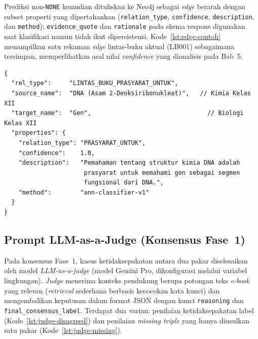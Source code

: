 \documentclass[../../thesis]{subfiles}
\begin{document}
\noindent Prediksi non-\texttt{NONE} kemudian dituliskan ke
Neo4j sebagai \textit{edge} berarah dengan subset properti yang
dipertahankan (\texttt{relation\_type}, \texttt{confidence},
\texttt{description}, dan \texttt{method}); \texttt{evidence\_quote} dan
\texttt{rationale} pada skema respons digunakan saat klasifikasi namun
tidak ikut dipersistensi. Kode~\ref{lst:edge-contoh} menampilkan satu
rekaman \textit{edge} lintas-buku aktual (LB001) sebagaimana tersimpan,
memperlihatkan asal nilai \textit{confidence} yang dianalisis pada
Bab~5.

\begin{lstlisting}[style=promptbox,caption={Contoh satu rekaman \textit{edge} lintas-buku aktual (LB001) sebagaimana dipersistensi ke Neo4j. Nilai \texttt{confidence} adalah skor \textit{self-reported} model untuk relasi ini (lihat Tabel~\ref{tab:conf-kalibrasi}).},label={lst:edge-contoh}]
{
  "rel_type":     "LINTAS_BUKU_PRASYARAT_UNTUK",
  "source_name":  "DNA (Asam 2-Deoksiribonukleat)",   // Kimia Kelas XII
  "target_name":  "Gen",                                // Biologi Kelas XII
  "properties": {
    "relation_type": "PRASYARAT_UNTUK",
    "confidence":    1.0,
    "description":   "Pemahaman tentang struktur kimia DNA adalah
                      prasyarat untuk memahami gen sebagai segmen
                      fungsional dari DNA.",
    "method":        "ann-classifier-v1"
  }
}
\end{lstlisting}

\subsection{Prompt LLM-as-a-Judge (Konsensus Fase~1)}
\label{lamp:prompt-judge}

Pada konsensus Fase~1, kasus ketidaksepakatan antara dua pakar diselesaikan oleh
model \textit{LLM-as-a-judge} (model Gemini Pro, dikonfigurasi melalui variabel
lingkungan). \textit{Judge} menerima konteks pendukung berupa potongan teks
\textit{e-book} yang relevan (\textit{retrieval} sederhana berbasis kecocokan
kata kunci) dan mengembalikan keputusan dalam format JSON dengan kunci
\texttt{reasoning} dan \texttt{final\_consensus\_label}. Terdapat dua varian:
penilaian ketidaksepakatan label (Kode~\ref{lst:judge-disagreed}) dan penilaian
\textit{missing triple} yang hanya diusulkan satu pakar (Kode~\ref{lst:judge-missing}).
\end{document}
